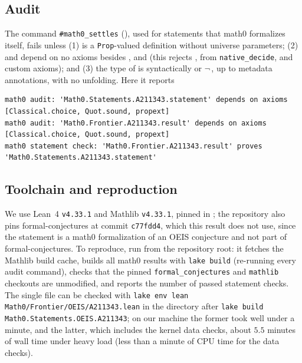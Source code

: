 \documentclass[11pt]{amsart}
\theoremstyle{plain}
\theoremstyle{definition}
\begin{document}
\subsection*{Audit}
The command \texttt{\#math0\_settles} (), used for statements that math0 formalizes itself, fails unless (1)  is a \texttt{Prop}-valued definition without universe parameters; (2)  and  depend on no axioms besides ,  and  (this rejects ,  from \texttt{native\_decide}, and custom axioms); and (3) the type of  is syntactically  or $\neg$\,, up to metadata annotations, with no unfolding. Here it reports
\begin{lstlisting}[basicstyle=\ttfamily\scriptsize]
math0 audit: 'Math0.Statements.A211343.statement' depends on axioms [Classical.choice, Quot.sound, propext]
math0 audit: 'Math0.Frontier.A211343.result' depends on axioms [Classical.choice, Quot.sound, propext]
math0 statement check: 'Math0.Frontier.A211343.result' proves 'Math0.Statements.A211343.statement'
\end{lstlisting}

\subsection*{Toolchain and reproduction}
We use Lean~4 \cite{Lean4} \texttt{v4.33.1} and Mathlib \cite{Mathlib} \texttt{v4.33.1}, pinned in ; the repository also pins formal-conjectures \cite{FC} at commit \texttt{c77fdd4}, which this result does not use, since the statement is a math0 formalization of an OEIS conjecture and not part of formal-conjectures.
To reproduce, run  from the repository root: it fetches the Mathlib build cache, builds all math0 results with \texttt{lake build} (re-running every audit command), checks that the pinned \texttt{formal\_conjectures} and \texttt{mathlib} checkouts are unmodified, and reports the number of passed statement checks. The single file can be checked with \texttt{lake env lean Math0/Frontier/OEIS/A211343.lean} in the directory  after \texttt{lake build Math0.Statements.OEIS.A211343}; on our machine the former took well under a minute, and the latter, which includes the kernel data checks, about $5.5$ minutes of wall time under heavy load (less than a minute of CPU time for the data checks).
\end{document}
